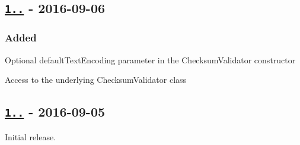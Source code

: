 \subsection*{\href{https://github.com/malept/sumchecker/compare/v1.0.0...v1.1.0}{\tt 1..} -\/ 2016-\/09-\/06}

\subsubsection*{Added}


\begin{DoxyItemize}
\item Optional {\ttfamily default\+Text\+Encoding} parameter in the {\ttfamily Checksum\+Validator} constructor
\item Access to the underlying {\ttfamily Checksum\+Validator} class
\end{DoxyItemize}

\subsection*{\href{https://github.com/malept/sumchecker/releases/tag/v1.0.0}{\tt 1..} -\/ 2016-\/09-\/05}

Initial release. 